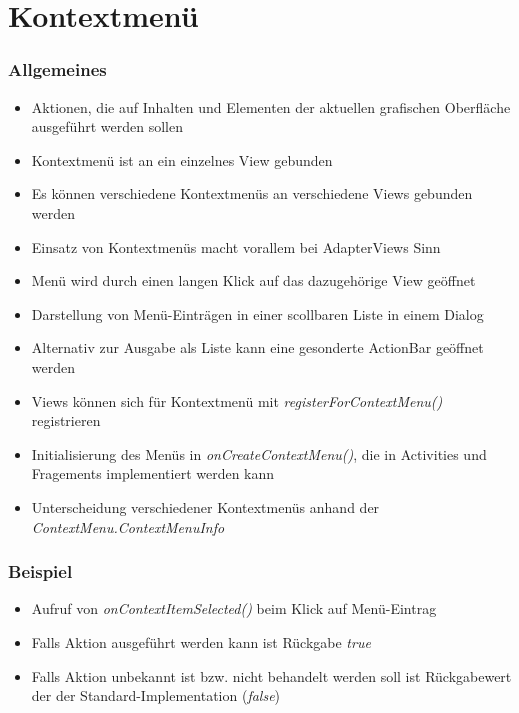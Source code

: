 \section{Kontextmenü}
\begin{frame}
   \frametitle{Allgemeines}
   \begin{itemize}
      \item Aktionen, die auf Inhalten und Elementen der aktuellen 
         grafischen Oberfläche ausgeführt werden sollen
      \item Kontextmenü ist an ein einzelnes View gebunden
      \item Es können verschiedene Kontextmenüs an verschiedene 
         Views gebunden werden
      \item Einsatz von Kontextmenüs macht vorallem bei AdapterViews Sinn
      \item Menü wird durch einen langen Klick auf das dazugehörige View geöffnet
      \item Darstellung von Menü-Einträgen in einer scollbaren Liste in einem Dialog
      \item Alternativ zur Ausgabe als Liste kann eine gesonderte 
      	ActionBar geöffnet werden
      \item Views können sich für Kontextmenü mit \emph{registerForContextMenu()} registrieren
      \item Initialisierung des Menüs in \emph{onCreateContextMenu()}, die in 
         Activities und Fragements implementiert werden kann
      \item Unterscheidung verschiedener Kontextmenüs anhand der \emph{ContextMenu.ContextMenuInfo}
   \end{itemize}
\end{frame}

\begin{frame}
   \frametitle{Beispiel}

   

   \begin{itemize}
      \item Aufruf von \emph{onContextItemSelected()} beim Klick auf Menü-Eintrag
      \item Falls Aktion ausgeführt werden kann ist Rückgabe \emph{true}
      \item Falls Aktion unbekannt ist bzw. nicht behandelt 
         werden soll ist Rückgabewert der der Standard-Implementation (\emph{false})
   \end{itemize}

   
\end{frame}

